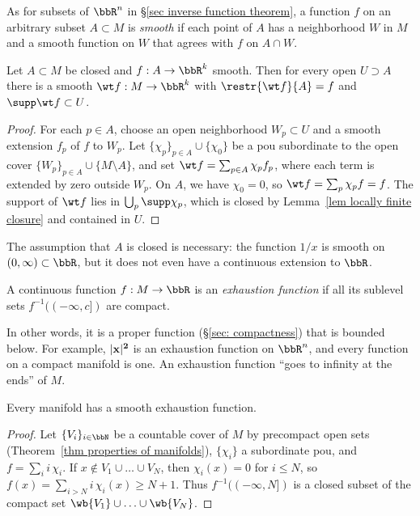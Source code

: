 As for subsets of $\bbR^n$ in \S\ref{sec inverse function theorem}, a function $f$ on an arbitrary subset $A\subset M$ is \emph{smooth} if each point of $A$ has a neighborhood $W$ in $M$ and a smooth function on $W$ that agrees with $f$ on $A\cap W$.

\begin{thm}\label{extension lemma}
    Let $A\subset M$ be closed and $f:A\to\bbR^k$ smooth. Then for every open $U\supset A$ there is a smooth $\wt f:M\to\bbR^k$ with $\restr{\wt f}{A}=f$ and $\supp\wt f\subset U$.
\end{thm}
\begin{proof}
    For each $p\in A$, choose an open neighborhood $W_p\subset U$ and a smooth extension $f_p$ of $f$ to $W_p$. Let $\{\chi_p\}_{p\in A}\cup\{\chi_0\}$ be a \gls{pou} subordinate to the open cover $\{W_p\}_{p\in A}\cup\{M\setminus A\}$, and set $\wt f=\sum_{p\in A}\chi_pf_p$, where each term is extended by zero outside $W_p$. On $A$, we have $\chi_0=0$, so $\wt f=\sum_p\chi_pf=f$. The support of $\wt f$ lies in $\bigcup_p\supp\chi_p$, which is closed by Lemma~\ref{lem locally finite closure} and contained in $U$.
\end{proof}
The assumption that $A$ is closed is necessary: the function $1/x$ is smooth on $(0,\infty)\subset\bbR$, but it does not even have a continuous extension to $\bbR$.

\begin{defn}
    A continuous function $f:M\to\bbR$ is an \emph{exhaustion function} if all its sublevel sets $f^{-1}((-\infty,c])$ are compact.
\end{defn}
In other words, it is a proper function (\S\ref{sec: compactness}) that is bounded below. For example, $\lvert\bf{x}\rvert^2$ is an exhaustion function on $\bbR^n$, and every function on a compact manifold is one. An exhaustion function ``goes to infinity at the ends'' of $M$.

\begin{prop}\label{prop.exhaustion}
    Every manifold has a smooth exhaustion function.
\end{prop}
\begin{proof}
    Let $\{V_i\}_{i\in\bbN}$ be a countable cover of $M$ by precompact open sets (Theorem~\ref{thm properties of manifolds}), $\{\chi_i\}$ a subordinate \gls{pou}, and $f=\sum_ii\,\chi_i$. If $x\notin V_1\cup\ldots\cup V_N$, then $\chi_i(x)=0$ for $i\leq N$, so $f(x)=\sum_{i>N}i\,\chi_i(x)\geq N+1$. Thus $f^{-1}((-\infty,N])$ is a closed subset of the compact set $\wb{V_1}\cup\ldots\cup\wb{V_N}$.
\end{proof}

